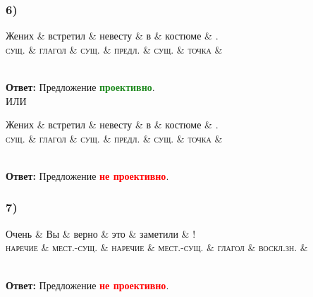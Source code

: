 \documentclass[14pt,extrafontsizes]{article}
\begin{document}
\subsubsection*{6)}
\begin{dependency}[theme = simple]
\begin{deptext}[column sep=1em]
Жених \& встретил \& невесту \& в \& костюме \& . \\
\textsc{сущ.} \& \textsc{глагол} \& \textsc{сущ.} \& \textsc{предл.} \& \textsc{сущ.} \& \textsc{точка} \&\\
\end{deptext}
\end{dependency}
\\
\textbf{Ответ: }Предложение \textcolor{ForestGreen}{\textbf{проективно}}.
\\
ИЛИ
\\
\begin{dependency}[theme = simple]
\begin{deptext}[column sep=1em]
Жених \& встретил \& невесту \& в \& костюме \& . \\
\textsc{сущ.} \& \textsc{глагол} \& \textsc{сущ.} \& \textsc{предл.} \& \textsc{сущ.} \& \textsc{точка} \&\\
\end{deptext}
\end{dependency}
\\
\textbf{Ответ: }Предложение \textcolor{red}{\textbf{не проективно}}.
\\
\subsubsection*{7)}
\begin{dependency}[theme = simple]
\begin{deptext}[column sep=1em]
Очень \& Вы \& верно \& это \& заметили \& ! \\
\textsc{наречие} \& \textsc{мест.-сущ.} \& \textsc{наречие} \& \textsc{мест.-сущ.} \& \textsc{глагол} \& \textsc{воскл.зн.} \&\\
\end{deptext}
\end{dependency}
\\
\textbf{Ответ: }Предложение \textcolor{red}{\textbf{не проективно}}.
\\
\end{document}
